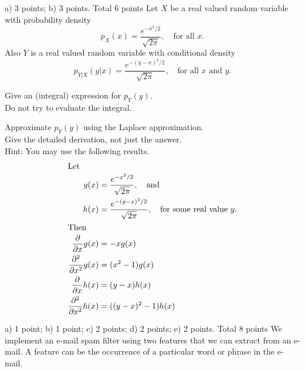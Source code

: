 \documentclass[a4paper]{article}
\newcommand{\tjboxed}[1]{}
\begin{document}
\begin{exam}
\begin{vraag}{a) 3 points; b) 3 points. Total 6 points}
    Let $X$ be a real valued random variable with probability
    density
    \[ p_X(x) = \frac{e^{-x^2/2}}{\sqrt{2\pi}},\quad\text{for all $x$}. \]
    Also $Y$ is a real valued random variable with conditional
    density
    \[ p_{Y|X}(y|x) = \frac{e^{-(y-x)^2/2}}{\sqrt{2\pi}},\quad\text{for
    all $x$ and $y$}. \]
    \begin{deelvraag}
        Give an (integral) expression for $p_Y(y)$.\\
        Do not try to evaluate the integral.
        \tjboxed{%
            \[ p_Y(y) = \int_{-\infty}^{\infty} p_X(x)p_{Y|X}(y|x)\,dx =
                \int_{-\infty}^{\infty}
                \frac{e^{-\frac12(x^2+(y-x)^2)}}{2\pi}\,dx \]
        }
    \end{deelvraag}
    \begin{deelvraag}
        Approximate $p_Y(y)$ using the Laplace approximation.\\
        Give the detailed derivation, not just the answer.\\
        Hint: You may use the following results.
        \begin{align*}
          \intertext{Let}
          g(x) &= \frac{e^{-x^2/2}}{\sqrt{2\pi}},\quad\text{and} \\
          h(x) &= \frac{e^{-(y-x)^2/2}}{\sqrt{2\pi}},\quad\text{for some real value $y$.} \\
          \intertext{Then}
          \frac{\partial}{\partial x}g(x) &= -xg(x) \\
          \frac{\partial^2}{\partial x^2}g(x) &= (x^2-1)g(x) \\
          \frac{\partial}{\partial x}h(x) &= (y-x)h(x) \\
          \frac{\partial^2}{\partial x^2}h(x) &= ((y-x)^2-1)h(x) \\
        \end{align*}
    \end{deelvraag}
\end{vraag}


\begin{vraag}{a) 1 point; b) 1 point; c) 2 points; d) 2 points; e) 2 points. Total 8 points}
We implement an e-mail spam filter using two features that we can extract from an e-mail.
A feature can be the occurrence of a particular word or phrase in the e-mail.


\end{vraag}
\end{exam}
\end{document}
